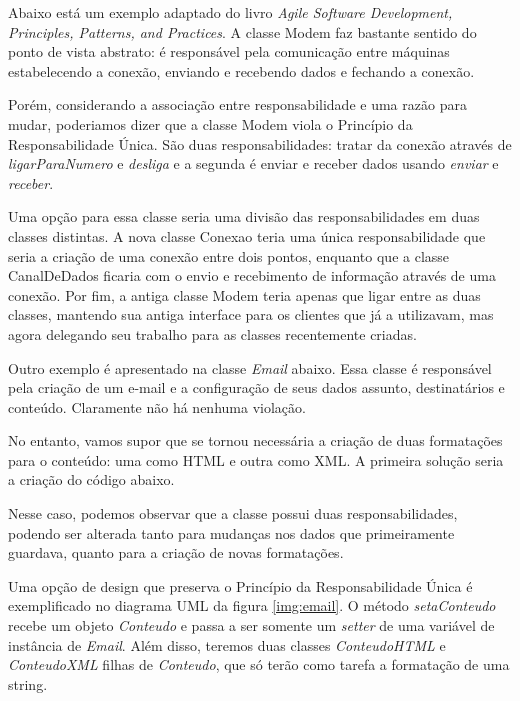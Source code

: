 Abaixo está um exemplo adaptado do livro \textit{Agile Software Development, Principles, Patterns, and
Practices}. A classe Modem faz bastante sentido do ponto de vista abstrato: é responsável pela comunicação entre máquinas estabelecendo a conexão, enviando e recebendo dados e fechando a conexão.



Porém, considerando a associação entre responsabilidade e uma razão para mudar, poderiamos dizer que a classe
Modem viola o Princípio da Responsabilidade Única. São duas responsabilidades: tratar da conexão através de 
\textit{ligarParaNumero} e \textit{desliga} e a segunda é enviar e receber dados usando \textit{enviar} e
\textit{receber}.

Uma opção para essa classe seria uma divisão das responsabilidades em duas classes distintas. A nova classe 
Conexao teria uma única responsabilidade que seria a criação de uma conexão entre dois pontos, enquanto que a 
classe CanalDeDados ficaria com o envio e recebimento de informação através de uma conexão. Por fim, a antiga 
classe Modem teria apenas que ligar entre as duas classes, mantendo sua antiga interface para os clientes que 
já a utilizavam, mas agora delegando seu trabalho para as classes recentemente criadas.

Outro exemplo é apresentado na classe \textit{Email} abaixo. Essa classe é responsável pela criação de um 
e-mail e a configuração de seus dados assunto, destinatários e conteúdo. Claramente não há nenhuma violação.



No entanto, vamos supor que se tornou necessária a criação de duas formatações para o conteúdo: uma como HTML e 
outra como XML. A primeira solução seria a criação do código abaixo.



Nesse caso, podemos observar que a classe possui duas responsabilidades, podendo ser alterada tanto para 
mudanças nos dados que primeiramente guardava, quanto para a criação de novas formatações.

Uma opção de design que preserva o Princípio da Responsabilidade Única é exemplificado no diagrama UML da figura \ref{img:email}.
O método \textit{setaConteudo} recebe um objeto \textit{Conteudo} e passa a ser somente um \textit{setter} de uma variável de instância de \textit{Email}. Além disso, teremos duas classes \textit{ConteudoHTML} e \textit{ConteudoXML} filhas de \textit{Conteudo}, que só terão como tarefa a formatação de uma string.

